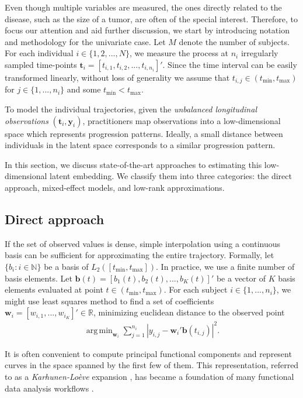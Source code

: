 \documentclass[preprint]{imsart}
\numberwithin{equation}{section}
\theoremstyle{plain}
\newcommand{\R}{\mathbb{R}}
\newcommand{\N}{\mathbb{N}}
\newcommand{\bb}{\mathbf{b}}
\newcommand{\bw}{\mathbf{w}}
\DeclareMathOperator*{\argmin}{arg\,min}
\begin{document}
Even though multiple variables are measured, the ones directly related to the disease, such as the size of a tumor, are often of the special interest. Therefore, to focus our attention and aid further discussion, we start by introducing notation and methodology for the univariate case. Let $M$ denote the number of subjects. For each individual $i \in \{ 1,2,...,N \}$, we measure the process at $n_i$ irregularly sampled time-points $\mathbf{t}_i = [t_{i,1},t_{i,2},...,t_{i,n_i}]'$. Since the time interval can be easily transformed linearly, without loss of generality we assume that $t_{i,j} \in (t_{\min},t_{\max})$ for $ j \in \{1,...,n_i\}$ and some $t_{\min} < t_{\max}$.

To model the individual trajectories, given the {\it unbalanced longitudinal observations} $(\mathbf{t}_i,\mathbf{y}_i)$, practitioners map observations into a low-dimensional space which represents progression patterns. Ideally, a small distance between individuals in the latent space corresponds to a similar progression pattern.

In this section, we discuss state-of-the-art approaches to estimating this low-dimensional latent embedding. We classify them into three categories: the direct approach, mixed-effect models, and low-rank approximations. 

\subsection{Direct approach}\label{ss:direct}

If the set of observed values is dense, simple interpolation using a continuous basis can be sufficient for approximating the entire trajectory. Formally, let $\{b_i: i \in \N \}$ be a basis of $L_2([t_{\min},t_{\max}])$. In practice, we use a finite number of basis elements. Let $\bb(t) = [b_1(t),b_2(t),...,b_K(t)]'$ be a vector of $K$ basis elements evaluated at point $t \in (t_{\min},t_{\max})$. For each subject $i \in \{ 1,...,n_i \}$, we might use least squares method to find a set of coefficients $\bw_i = [w_{i,1},...,w_{i_K}]' \in \R$, minimizing euclidean distance to the observed point
\begin{align}\label{eq:direct-individual}
 \argmin_{\bw_i}\sum_{j=1}^{n_i}\left|y_{i,j} - \bw_i'\bb(t_{i,j})\right|^2.
\end{align}

It is often convenient to compute principal functional components and represent curves in the space spanned by the first few of them. This representation, referred to as a {\it Karhunen-Lo\`eve} expansion \citep{watanabe1965karhunen,kosambi2016statistics}, has became a foundation of many functional data analysis workflows \citep{ramsay1991some,yao2005linear,cnaan1997tutorial,laird1988missing,hormann2015dynamic,horvath2012inference,besse1997simultaneous}. %
\end{document}
